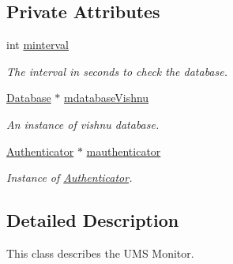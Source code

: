 \subsection*{Private Attributes}
\begin{DoxyCompactItemize}
\item 
\hypertarget{classMonitorUMS_a1d5bb8d46af814421bd426bca2ea19b5}{
int \hyperlink{classMonitorUMS_a1d5bb8d46af814421bd426bca2ea19b5}{minterval}}
\label{classMonitorUMS_a1d5bb8d46af814421bd426bca2ea19b5}

\begin{DoxyCompactList}\small\item\em The interval in seconds to check the database. \item\end{DoxyCompactList}\item 
\hypertarget{classMonitorUMS_ac1d6be2c23b3b81a2a06e2547f0aa34e}{
\hyperlink{classDatabase}{Database} $\ast$ \hyperlink{classMonitorUMS_ac1d6be2c23b3b81a2a06e2547f0aa34e}{mdatabaseVishnu}}
\label{classMonitorUMS_ac1d6be2c23b3b81a2a06e2547f0aa34e}

\begin{DoxyCompactList}\small\item\em An instance of vishnu database. \item\end{DoxyCompactList}\item 
\hypertarget{classMonitorUMS_aecae830bd78d377f6e14773d8c30ffd0}{
\hyperlink{classAuthenticator}{Authenticator} $\ast$ \hyperlink{classMonitorUMS_aecae830bd78d377f6e14773d8c30ffd0}{mauthenticator}}
\label{classMonitorUMS_aecae830bd78d377f6e14773d8c30ffd0}

\begin{DoxyCompactList}\small\item\em Instance of \hyperlink{classAuthenticator}{Authenticator}. \item\end{DoxyCompactList}\end{DoxyCompactItemize}


\subsection{Detailed Description}
This class describes the UMS Monitor. 

